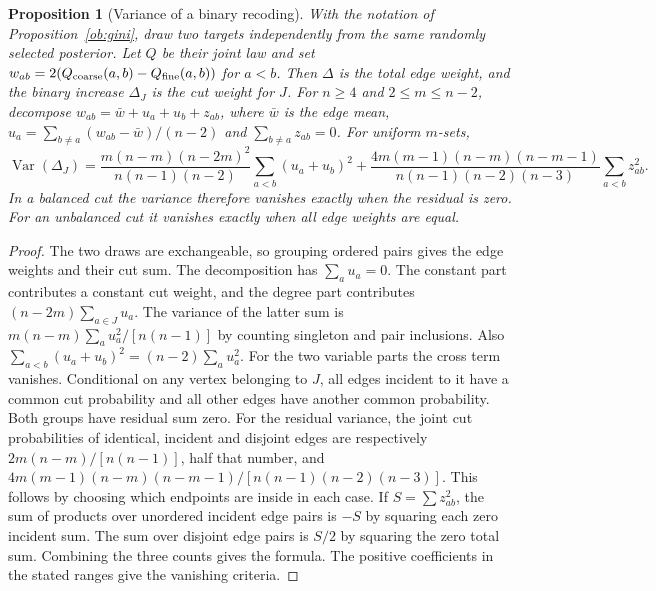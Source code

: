 \documentclass[aps,pra,onecolumn,superscriptaddress,nofootinbib,10pt]{revtex4-2}
\newtheorem{proposition}[theorem]{Proposition}
\theoremstyle{definition}
\theoremstyle{remark}
\begin{document}
\begin{proposition}[Variance of a binary recoding]\label{ob:cutvariance}
With the notation of Proposition~\ref{ob:gini}, draw two targets
independently from the same randomly selected posterior. Let $Q$ be
their joint law and set $w_{ab}=2(Q_{\rm coarse}(a,b)-Q_{\rm fine}(a,b))$
for $a<b$. Then $\Delta$ is the total edge weight, and the binary
increase $\Delta_J$ is the cut weight for $J$.
For $n\ge4$ and $2\le m\le n-2$, decompose
$w_{ab}=\bar w+u_a+u_b+z_{ab}$, where $\bar w$ is the edge mean,
$u_a=\sum_{b\ne a}(w_{ab}-\bar w)/(n-2)$ and
$\sum_{b\ne a}z_{ab}=0$. For uniform $m$-sets,
\[
 \operatorname{Var}(\Delta_J)=
 \frac{m(n-m)(n-2m)^2}{n(n-1)(n-2)}\sum_{a<b}(u_a+u_b)^2
 +\frac{4m(m-1)(n-m)(n-m-1)}{n(n-1)(n-2)(n-3)}
   \sum_{a<b}z_{ab}^2 .
\]
In a balanced cut the variance therefore vanishes exactly when the
residual is zero. For an unbalanced cut it vanishes exactly when
all edge weights are equal.
\end{proposition}
\begin{proof}
The two draws are exchangeable, so grouping ordered pairs gives the
edge weights and their cut sum. The decomposition has $\sum_a u_a=0$.
The constant part contributes a constant cut weight, and the degree part
contributes $(n-2m)\sum_{a\in J}u_a$. The variance of the latter sum is
$m(n-m)\sum_a u_a^2/[n(n-1)]$ by counting singleton and pair
inclusions. Also $\sum_{a<b}(u_a+u_b)^2=(n-2)\sum_a u_a^2$.
For the two variable parts the cross term vanishes. Conditional on
any vertex belonging to $J$, all edges incident to it have a common
cut probability and all other edges have another common probability.
Both groups have residual sum zero. For the residual variance, the
joint cut probabilities of identical, incident and disjoint edges
are respectively $2m(n-m)/[n(n-1)]$, half that number, and
$4m(m-1)(n-m)(n-m-1)/[n(n-1)(n-2)(n-3)]$. This follows by choosing
which endpoints are inside in each case. If $S=\sum z_{ab}^2$,
the sum of products over unordered incident edge pairs is $-S$ by
squaring each zero incident sum. The sum over disjoint edge pairs is
$S/2$ by squaring the zero total sum. Combining the three counts
gives the formula. The positive coefficients in the stated ranges
give the vanishing criteria.
\end{proof}
\end{document}
